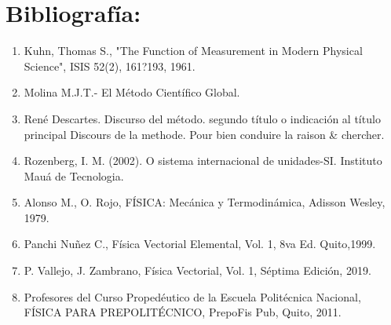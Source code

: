 \chapter*{Bibliografía:}

\begin{enumerate}
\item Kuhn, Thomas S., "The Function of Measurement in Modern Physical Science", ISIS 52(2), 161?193, 1961.
 
\item Molina M.J.T.- El Método Científico Global.
 
\item René Descartes. Discurso del método. segundo título o indicación al título principal Discours de la methode. Pour bien 
conduire la raison \& chercher.
 
\item Rozenberg, I. M. (2002). O sistema internacional de unidades-SI. Instituto Mauá de Tecnologia.
 
\item Alonso M., O. Rojo, FÍSICA: Mecánica y Termodinámica, Adisson Wesley, 1979.

\item Panchi Nuñez C., Física Vectorial Elemental, Vol. 1, 8va Ed. Quito,1999.

\item P. Vallejo, J. Zambrano, Física Vectorial, Vol. 1, Séptima Edición, 2019.

\item Profesores del Curso Propedéutico de la Escuela Politécnica Nacional, FÍSICA PARA PREPOLITÉCNICO, PrepoFis Pub, Quito, 2011.  

\end{enumerate}
